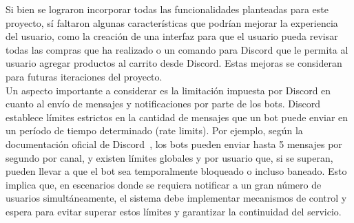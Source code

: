 \documentclass[a4paper,12pt]{article}
\begin{document}
Si bien se lograron incorporar todas las funcionalidades planteadas para este proyecto, sí faltaron algunas características que podrían mejorar la experiencia del usuario, como la creación de una interfaz para que el usuario pueda revisar todas las compras que ha realizado o un comando para Discord que le permita al usuario agregar productos al carrito desde Discord. Estas mejoras se consideran para futuras iteraciones del proyecto.\\

Un aspecto importante a considerar es la limitación impuesta por Discord en cuanto al envío de mensajes y notificaciones por parte de los bots. Discord establece límites estrictos en la cantidad de mensajes que un bot puede enviar en un período de tiempo determinado (rate limits). Por ejemplo, según la documentación oficial de Discord~\cite{discordlimits}, los bots pueden enviar hasta 5 mensajes por segundo por canal, y existen límites globales y por usuario que, si se superan, pueden llevar a que el bot sea temporalmente bloqueado o incluso baneado. Esto implica que, en escenarios donde se requiera notificar a un gran número de usuarios simultáneamente, el sistema debe implementar mecanismos de control y espera para evitar superar estos límites y garantizar la continuidad del servicio.


\newpage
\end{document}
